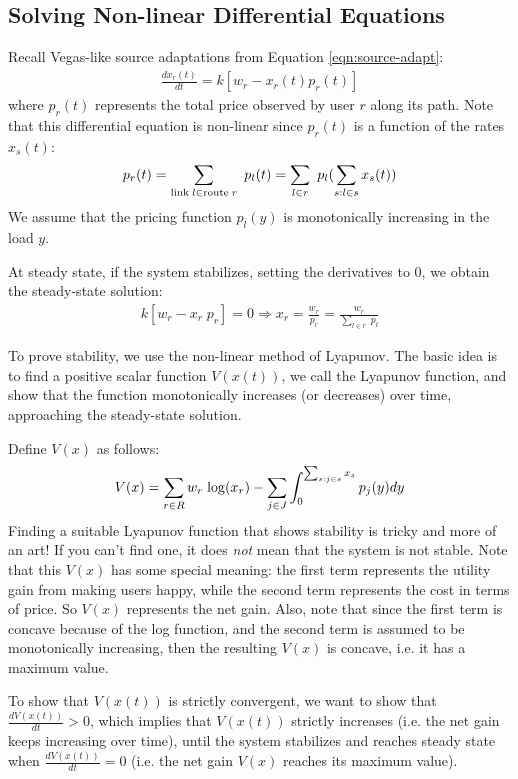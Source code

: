 \documentclass{article}
\def\lg{{\rm log}}
\begin{document}
\subsection{Solving Non-linear Differential Equations}

Recall Vegas-like source adaptations from Equation \ref{eqn:source-adapt}:
\begin{eqnarray*}
\frac{d x_r(t)}{dt} = k [w_r - x_r(t) p_r(t)]
\end{eqnarray*}
where $p_r(t)$ represents the total price observed by user $r$ along its path.
Note that this differential equation is non-linear since $p_r(t)$ is a function of the rates $x_s(t)$:
\begin{eqnarray*}
p_r(t) = \sum_{{\rm link}\; l \in {\rm route}\; r}\ p_l(t) = \sum_{l \in r}\ p_l(\sum_{s: l \in s} x_s(t))
\end{eqnarray*}
We assume that the pricing function $p_l(y)$ is monotonically increasing in the load $y$.

At steady state, if the system stabilizes, setting the derivatives to 0, we obtain the steady-state solution:
\begin{eqnarray*}
 k [w_r - x_r\; p_r] = 0 \Rightarrow x_r = \frac{w_r}{p_r} = \frac{w_r}{\sum_{l \in r}\; p_l}
\end{eqnarray*}

To prove stability, we use the non-linear method of Lyapunov.
The basic idea is to find a positive scalar function $V(x(t))$, we call the Lyapunov function,
and show that the function monotonically increases (or decreases)
over time, approaching the steady-state solution.

Define $V(x)$ as follows:
\begin{eqnarray*}
V(x) = \sum_{r \in R} w_r \; \lg(x_r) - \sum_{j \in J} \int_{0}^{\sum_{s: j \in s} x_s} p_j(y) dy
\end{eqnarray*}
Finding a suitable Lyapunov function that shows stability is tricky and more of an art!
If you can't find one, it does {\em not} mean that the system is not stable.
Note that this $V(x)$ has some special meaning:
the first term represents the utility gain from making users happy,
while the second term represents the cost in terms of price.
So $V(x)$ represents the net gain.
Also, note that since the first term is concave because of the log function,
and the second term is assumed to be monotonically increasing,
then the resulting $V(x)$ is concave, i.e. it has a maximum value.

To show that $V(x(t))$ is strictly convergent, we want to show that $\frac{dV(x(t))}{dt} > 0$,
which implies that $V(x(t))$ strictly increases (i.e. the net gain keeps increasing over time), 
until the system stabilizes and reaches steady state when $\frac{dV(x(t))}{dt} = 0$ 
(i.e. the net gain $V(x)$ reaches its maximum value).
\end{document}
